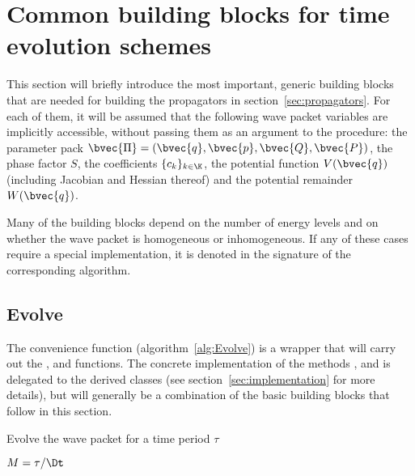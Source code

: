 \section{Common building blocks for time evolution schemes}
\label{sec:buildingblocks}
%
This section will briefly introduce the most important, generic building blocks that are needed for building the propagators in section~\ref{sec:propagators}.
For each of them, it will be assumed that the following wave packet variables are implicitly accessible, without passing them as an argument to the procedure: the parameter pack $\bvec{\Pi} = (\bvec{q},\bvec{p},\bvec{Q},\bvec{P})$, the phase factor $S$, the coefficients $\{ c_k \}_{k \in \K}$, the potential function $V(\bvec{q})$ (including Jacobian and Hessian thereof) and the potential remainder $W(\bvec{q})$.
\par\medskip
%
Many of the building blocks depend on the number of energy levels and on whether the wave packet is homogeneous or inhomogeneous.
If any of these cases require a special implementation, it is denoted in the signature of the corresponding algorithm.


\subsection{Evolve}
\label{subsec:evolve}
The convenience function  (algorithm~\ref{alg:Evolve}) is a wrapper that will carry out the ,  and  functions.
The concrete implementation of the methods ,  and  is delegated to the derived classes (see section~\ref{sec:implementation} for more details),
but will generally be a combination of the basic building blocks that follow in this section.
%
\begin{algorithm}[h]
	\caption{Evolve the wave packet for a time period $\tau$}
	\label{alg:Evolve}
	\begin{algorithmic}
		\State
		\State
		\State $M = \tau/\Dt$
		\State {}
			\State {}
		\EndFor
		\State {}
	\EndProcedure
	\State
	\end{algorithmic}
\end{algorithm}


